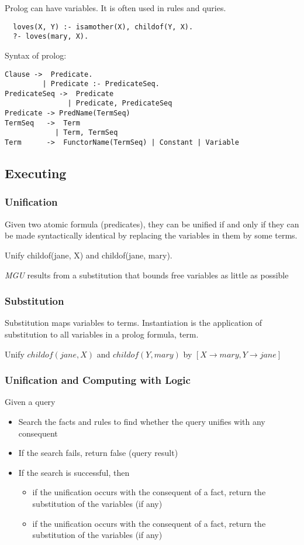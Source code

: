 Prolog can have variables. It is often used in rules and quries.
\begin{lstlisting}
  loves(X, Y) :- isamother(X), childof(Y, X).
  ?- loves(mary, X).
\end{lstlisting}

Syntax of prolog:
\begin{lstlisting}
Clause ->  Predicate.
         | Predicate :- PredicateSeq.
PredicateSeq ->  Predicate
               | Predicate, PredicateSeq
Predicate -> PredName(TermSeq)
TermSeq   ->  Term
            | Term, TermSeq
Term      ->  FunctorName(TermSeq) | Constant | Variable
\end{lstlisting}

\subsection{Executing}
\subsubsection{Unification}
Given two atomic formula (predicates), they can be unified if and only
if they can be made syntactically identical by replacing the variables
in them by some terms.

Unify childof(jane, X) and childof(jane, mary).

\textit{MGU} results from a substitution that bounds free variables as little
as possible

\subsubsection{Substitution}
Substitution maps variables to terms.  Instantiation is the
application of substitution to all variables in a prolog formula,
term.

Unify $childof(jane, X)$ and $childof(Y, mary)$ by $[X \rightarrow mary, Y \rightarrow jane]$

\subsubsection{Unification and Computing with Logic}

Given a query
\begin{itemize}
\item Search the facts and rules to find whether the query unifies
  with any consequent
\item If the search fails, return false (query result)
\item If the search is successful, then
  \begin{itemize}
  \item if the unification occurs with the consequent of a fact,
    return the substitution of the variables (if any)
  \item if the unification occurs with the consequent of a fact,
    return the substitution of the variables (if any)
  \end{itemize}
\end{itemize}

